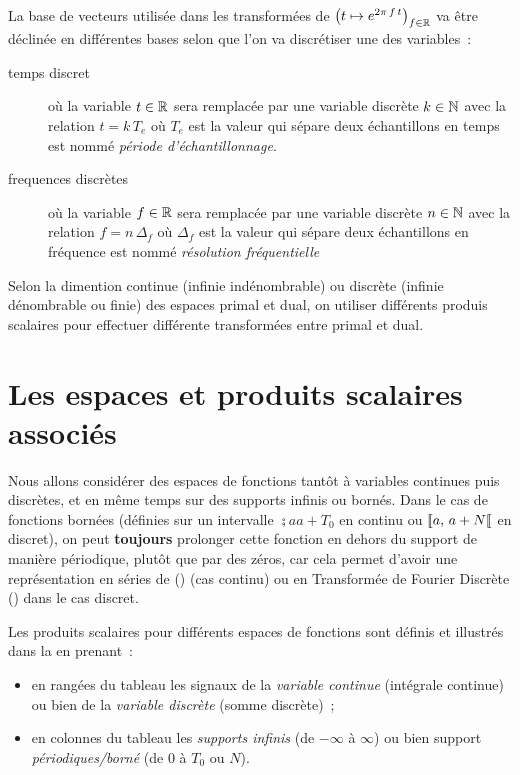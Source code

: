 La base de vecteurs utilisée dans les transformées de \Fourier{}
$\left(t\mapsto e^{2\pi\,f\,t}\right)_{f\in\mathbb{R}}$ va être déclinée en différentes
bases selon que l'on va discrétiser une des variables~:

\begin{description}
\item[temps discret] où la variable $t\in\mathbb{R}$ sera remplacée par une variable discrète $k\in\mathbb{N}$ avec la relation $t=k\,T_e$ où $T_e$ est la valeur qui sépare deux échantillons en temps est nommé \emph{période d'échantillonnage}.
\item[frequences discrètes] où la variable $f\in\mathbb{R}$ sera remplacée par une variable discrète $n\in\mathbb{N}$ avec la relation $f=n\,\Delta_f$ où $\Delta_f$ est la valeur qui sépare deux échantillons en fréquence est nommé \emph{résolution fréquentielle}
\end{description}

Selon la dimention continue (infinie indénombrable) ou discrète
(infinie dénombrable ou finie) des espaces primal et dual, on utiliser
différents produis scalaires pour effectuer différente transformées
entre primal et dual.

\section{Les espaces et produits scalaires associés}
Nous allons considérer des espaces de fonctions tantôt à variables
continues puis discrètes, et en même temps sur des supports infinis ou
bornés. Dans le cas de fonctions bornées (définies sur un intervalle $\semi{a}{a+T_0}$ en continu ou ${[\![ a,\,a+N[\![}$ en discret), on peut \textbf{toujours} prolonger cette fonction
en dehors du support de manière périodique, plutôt que par des zéros, car cela permet d'avoir une représentation en séries de \Fourier{} (\sdf{}) (cas continu) ou en Transformée de Fourier Discrète (\TFD{}) dans le cas discret.

Les produits scalaires pour différents espaces de fonctions sont définis et illustrés dans la  en prenant~:
\begin{itemize}
\item  en rangées du tableau les signaux de la \emph{variable continue} (intégrale continue) ou bien de la \emph{variable discrète} (somme discrète)~;
\item en colonnes du tableau les \emph{supports infinis} (de $-\infty$ à $\infty$) ou bien support \emph{périodiques/borné} (de $0$ à $T_0$ ou $N$).
\end{itemize}

